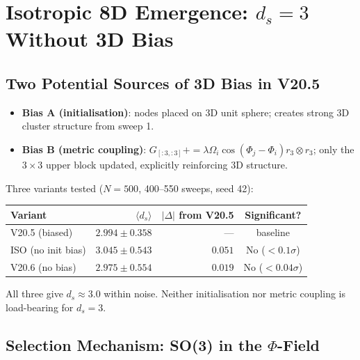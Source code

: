 \documentclass[12pt, a4paper]{article}
\begin{document}
\section{Isotropic 8D Emergence: $d_s=3$ Without 3D Bias}

\subsection{Two Potential Sources of 3D Bias in V20.5}

\begin{itemize}
\item \textbf{Bias A (initialisation)}: nodes placed on 3D unit sphere; creates strong 3D cluster structure from sweep 1.
\item \textbf{Bias B (metric coupling)}: $G_{[:3,:3]}+=\lambda\Omega_i\cos(\Phi_j-\Phi_i)r_3\otimes r_3$; only the $3\times 3$ upper block updated, explicitly reinforcing 3D structure.
\end{itemize}

Three variants tested ($N=500$, 400--550 sweeps, seed 42):

\begin{derivedbox}[title={Primary Result: $d_s=3$ Without 3D Bias (Confirmed)}]
\begin{center}
\renewcommand{\arraystretch}{1.6}
\begin{tabular}{lrrc}
\toprule
Variant & $\langle d_s\rangle$ & $|\Delta|$ from V20.5 & Significant?\\
\midrule
V20.5 (biased) & $2.994\pm 0.358$ & --- & baseline\\
ISO (no init bias) & $3.045\pm 0.543$ & $0.051$ & No ($<0.1\sigma$)\\
V20.6 (no bias) & $2.975\pm 0.554$ & $0.019$ & No ($<0.04\sigma$)\\
\bottomrule
\end{tabular}
\end{center}
All three give $d_s\approx 3.0$ within noise. Neither initialisation nor metric coupling is load-bearing for $d_s=3$.
\end{derivedbox}

\subsection{Selection Mechanism: SO(3) in the $\Phi$-Field}
\end{document}
